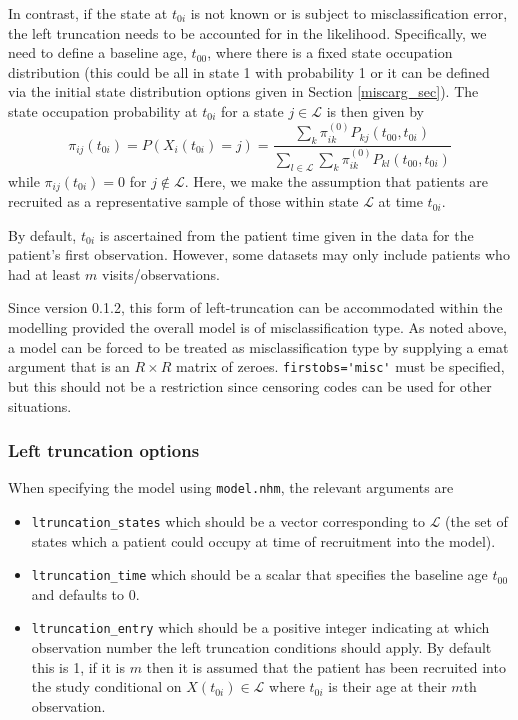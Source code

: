 \documentclass{article}
\numberwithin{equation}{section}
\begin{document}
In contrast, if the state at $t_{0i}$ is not known or is subject to misclassification error, the left truncation needs to be accounted for in the likelihood. Specifically, we need to define a baseline age, $t_{00}$, where there is a fixed state occupation distribution (this could be all in state 1 with probability 1 or it can be defined via the initial state distribution options given in Section \ref{miscarg_sec}). The state occupation probability at $t_{0i}$ for a state $j \in \mathcal{L}$ is then given by
$$\pi_{ij}(t_{0i}) = P(X_i(t_{0i}) = j) = \frac{\sum_{k} \pi^{(0)}_{ik} P_{kj}(t_{00}, t_{0i})}{\sum_{l \in \mathcal{L}} \sum_{k} \pi^{(0)}_{ik} P_{kl}(t_{00}, t_{0i})}$$
while $\pi_{ij}(t_{0i}) = 0$ for $j \notin \mathcal{L}$.
Here, we make the assumption that patients are recruited as a representative sample of those within state $\mathcal{L}$ at time $t_{0i}$.

By default, $t_{0i}$ is ascertained from the patient time given in the data for the patient's first observation. However, some datasets may only include patients who had at least $m$ visits/observations. 

Since version 0.1.2, this form of left-truncation can be accommodated within the modelling provided the overall model is of misclassification type. As noted above, a model can be forced to be treated as misclassification type by supplying a emat argument that is an $R \times R$ matrix of zeroes. \verb!firstobs='misc'! must be specified, but this should not be a restriction since censoring codes can be used for other situations.

\subsubsection*{Left truncation options}
When specifying the model using \verb!model.nhm!, the relevant arguments are 
\begin{itemize}
\item \verb!ltruncation_states! which should be a vector corresponding to $\mathcal{L}$ (the set of states which a patient could occupy at time of recruitment into the model). 
\item \verb!ltruncation_time! which should be a scalar that specifies the baseline age $t_{00}$ and defaults to 0.
\item \verb!ltruncation_entry! which should be a positive integer indicating at which observation number the left truncation conditions should apply. By default this is 1, if it is $m$ then it is assumed that the patient has been recruited into the study conditional on $X(t_{0i}) \in \mathcal{L}$ where $t_{0i}$ is their age at their $m$th observation.
\end{itemize}
\end{document}
